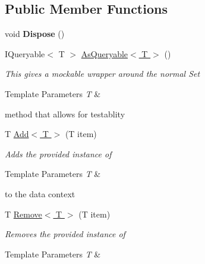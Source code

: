 \subsection*{Public Member Functions}
\begin{DoxyCompactItemize}
\item 
\hypertarget{class_framework_extension_1_1_entity_framework_1_1_tests_1_1_unit_tests_1_1_commit_events_mock_context_ad82d7b3128c3ebe211590cd135624215}{void {\bfseries Dispose} ()}\label{class_framework_extension_1_1_entity_framework_1_1_tests_1_1_unit_tests_1_1_commit_events_mock_context_ad82d7b3128c3ebe211590cd135624215}

\item 
I\-Queryable$<$ T $>$ \hyperlink{class_framework_extension_1_1_entity_framework_1_1_tests_1_1_unit_tests_1_1_commit_events_mock_context_a1d47f5a08a631c9cb42df64ed2f607c8}{As\-Queryable$<$ T $>$} ()
\begin{DoxyCompactList}\small\item\em This gives a mockable wrapper around the normal Set
\begin{DoxyTemplParams}{Template Parameters}
{\em T} & \\
\hline
\end{DoxyTemplParams}
method that allows for testablity \end{DoxyCompactList}\item 
T \hyperlink{class_framework_extension_1_1_entity_framework_1_1_tests_1_1_unit_tests_1_1_commit_events_mock_context_aa849c2f2553f381457c5003406c5d963}{Add$<$ T $>$} (T item)
\begin{DoxyCompactList}\small\item\em Adds the provided instance of 
\begin{DoxyTemplParams}{Template Parameters}
{\em T} & \\
\hline
\end{DoxyTemplParams}
to the data context \end{DoxyCompactList}\item 
T \hyperlink{class_framework_extension_1_1_entity_framework_1_1_tests_1_1_unit_tests_1_1_commit_events_mock_context_a82ddc0eccd022f543467c4cc4e53db9b}{Remove$<$ T $>$} (T item)
\begin{DoxyCompactList}\small\item\em Removes the provided instance of 
\begin{DoxyTemplParams}{Template Parameters}
{\em T} & \\
\hline
\end{DoxyTemplParams}

\end{DoxyCompactList}
\end{DoxyCompactItemize}
